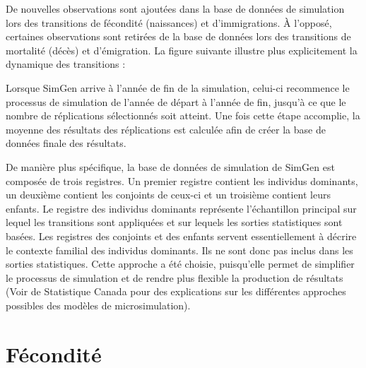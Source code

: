 \documentclass[letterpaper,10pt,french]{sphinxmanual}
\begin{document}
De nouvelles observations sont ajoutées dans la base de données de simulation
lors des transitions de fécondité (naissances) et d’immigrations. À l’opposé,
certaines observations sont retirées de la base de données lors des transitions de mortalité (décès) et
d’émigration. La figure suivante illustre plus explicitement la dynamique des transitions :

\begin{figure}[htbp]
\centering

\noindent{}
\end{figure}

Lorsque SimGen arrive à l’année de fin de la simulation, celui-ci recommence le processus de simulation
de l’année de départ à l’année de fin, jusqu’à ce que le nombre de réplications sélectionnés soit atteint.
Une fois cette étape accomplie, la moyenne des résultats des réplications est calculée afin de créer
la base de données finale des résultats.


De manière plus spécifique, la base de données de simulation de SimGen est composée de trois registres. Un premier registre contient les individus dominants, un deuxième contient les conjoints de ceux-ci et
un troisième contient leurs enfants. Le registre des individus dominants représente l’échantillon principal sur lequel les transitions sont appliquées et sur lequels les sorties statistiques sont basées.
Les registres des conjoints et des enfants servent essentiellement à décrire le contexte familial des individus dominants. Ils ne sont donc pas inclus dans les sorties statistiques.
Cette approche a été choisie, puisqu’elle permet de simplifier le processus de simulation et de rendre plus flexible la production de résultats
(Voir  de Statistique Canada
pour des explications sur les différentes approches possibles des modèles de microsimulation).


\section{Fécondité}
\label{\detokenize{methodologie:fecondite}}
\end{document}
